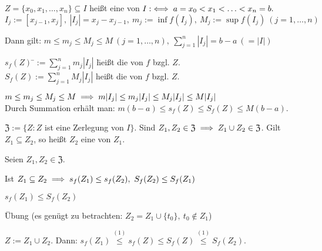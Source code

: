 \documentclass[a4paper,oneside,DIV15,BCOR12mm]{scrbook}
\begin{document}
\def\Z{\ensuremath{\mathfrak{Z}}}

\begin{definition}
$Z = \{x_0,x_1,\ldots,x_n\} \subseteq I$ heißt eine  von $I :\iff a = x_0 < x_1 < \ldots < x_n = b.$\\
$I_j := [x_{j-1},x_j],\ |I_j| = x_j-x_{j-1},\ m_j := \inf f(I_j),\ M_j := \sup f(I_j)\ (j = 1,\ldots,n)$

Dann gilt: $m \le m_j \le M_j \le M\ (j = 1,\ldots,n),\ \sum_{j=1}^{n}{|I_j|} = b-a\ (=|I|)$
\begin{tabbing}
$s_f(Z) $ \=$:= \sum_{j=1}^{n}{m_j |I_j|}$ \=heißt die  von $f$ bzgl. $Z$.\\
$S_f(Z) $\>$:= \sum_{j=1}^{n}{M_j |I_j|}$ \>heißt die  von $f$ bzgl. $Z$.
\end{tabbing}

$m \le m_j \le M_j \le M \implies m|I_j| \le m_j|I_j| \le M_j|I_j| \le M|I_j|$\\
Durch Summation erhält man: $m(b-a) \le s_f(Z) \le S_f(Z) \le M(b-a)$.

$\Z := \{Z: Z$ ist eine Zerlegung von $I\}.$ Sind $Z_1,Z_2 \in \Z \folgt Z_1 \cup Z_2 \in \Z$. Gilt $Z_1 \subseteq Z_2$, so heißt $Z_2$ eine  von $Z_1$.
\end{definition}

\begin{satz}
Seien $Z_1,Z_2 \in \Z$.
\begin{liste}
\item Ist $Z_1 \subseteq Z_2 \implies s_f(Z_1) \le s_f(Z_2),\ S_f(Z_2) \le S_f(Z_1)$
\item $s_f(Z_1) \le S_f(Z_2)$
\end{liste}
\end{satz}

\begin{beweise}
\item Übung (es genügt zu betrachten: $Z_2 = Z_1 \cup \{t_0\},\ t_0 \notin Z_1$)
\item $Z := Z_1 \cup Z_2$. Dann: $s_f(Z_1) \overset{(1)}{\le} s_f(Z) \le S_f(Z) \overset{(1)}{\le} S_f(Z_2).$
\end{beweise}

\def\dx{\text{d}x}
\def\dt{\text{d}t}
\def\uint{\declareslashed{}{\text{-}}{0}{-.7}{\int} \ensuremath{\slashed{\int}}}
\def\oint{\declareslashed{}{\text{-}}{.15}{.7}{\int} \ensuremath{\slashed{\int}}}
\end{document}
